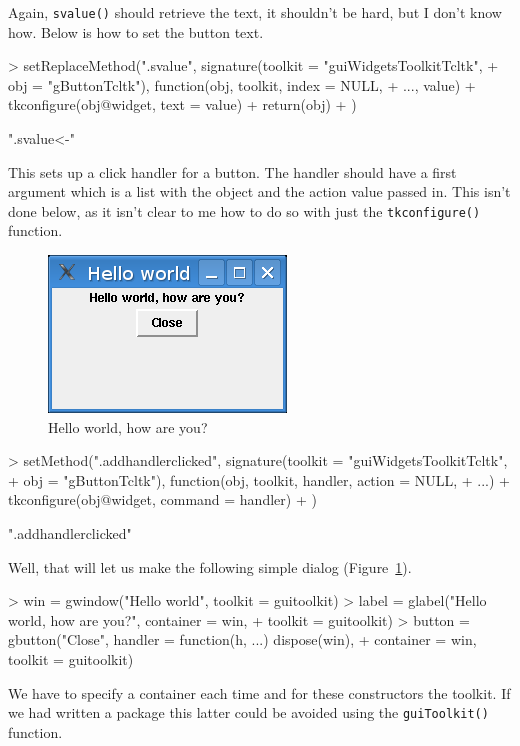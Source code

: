\documentclass[12pt]{article}
\newcommand{\RFunc}[1]{\texttt{#1()}}
\begin{document}
Again, \RFunc{svalue} should retrieve the text, it shouldn't be hard,
but I don't know how. Below is how to set the button text.
\begin{Schunk}
\begin{Sinput}
> setReplaceMethod(".svalue", signature(toolkit = "guiWidgetsToolkitTcltk", 
+     obj = "gButtonTcltk"), function(obj, toolkit, index = NULL, 
+     ..., value) {
+     tkconfigure(obj@widget, text = value)
+     return(obj)
+ })
\end{Sinput}
\begin{Soutput}
[1] ".svalue<-"
\end{Soutput}
\end{Schunk}


This sets up a click handler for a button. The handler should have a
first argument which is a list with the object and the action value
passed in. This isn't done below, as it isn't clear to me how to do so
with just the \RFunc{tkconfigure} function.


\begin{figure}[htbp]
  \centering
  \includegraphics[width=.4\textwidth]{hello-world}
  \caption{Hello world, how are you?}
  \label{fig:hello-world}
\end{figure}



\begin{Schunk}
\begin{Sinput}
> setMethod(".addhandlerclicked", signature(toolkit = "guiWidgetsToolkitTcltk", 
+     obj = "gButtonTcltk"), function(obj, toolkit, handler, action = NULL, 
+     ...) {
+     tkconfigure(obj@widget, command = handler)
+ })
\end{Sinput}
\begin{Soutput}
[1] ".addhandlerclicked"
\end{Soutput}
\end{Schunk}

Well, that will let us make the following simple dialog
(Figure~\ref{fig:hello-world}).


\begin{Schunk}
\begin{Sinput}
> win = gwindow("Hello world", toolkit = guitoolkit)
> label = glabel("Hello world, how are you?", container = win, 
+     toolkit = guitoolkit)
> button = gbutton("Close", handler = function(h, ...) dispose(win), 
+     container = win, toolkit = guitoolkit)
\end{Sinput}
\end{Schunk}


We have to specify a container each time and for these constructors
the toolkit. If we had written a package this latter could be
avoided using the \RFunc{guiToolkit} function.
\end{document}
